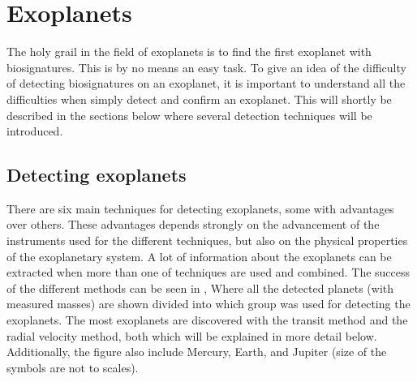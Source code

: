 \section{Exoplanets}
\label{sec:exoplanets}

The holy grail in the field of exoplanets is to find the first exoplanet with biosignatures. This is
by no means an easy task. To give an idea of the difficulty of detecting biosignatures on an
exoplanet, it is important to understand all the difficulties when simply detect and confirm an
exoplanet. This will shortly be described in the sections below where several detection techniques
will be introduced.

\subsection{Detecting exoplanets}
\label{sec:detecting_exoplanets}

There are six main techniques for detecting exoplanets, some with advantages over others. These
advantages depends strongly on the advancement of the instruments used for the different techniques,
but also on the physical properties of the exoplanetary system. A lot of information about the
exoplanets can be extracted when more than one of techniques are used and combined. The success of
the different methods can be seen in , Where all the detected planets (with
measured masses) are shown divided into which group was used for detecting the exoplanets. The most
exoplanets are discovered with the transit method and the radial velocity method, both which will be
explained in more detail below. Additionally, the figure also include Mercury, Earth, and Jupiter
(size of the symbols are not to scales).

